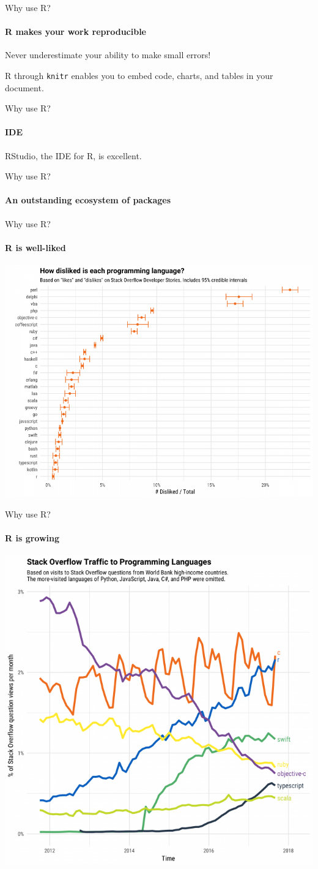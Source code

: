 \documentclass{grattan_pres}\usepackage[]{graphicx}\usepackage[]{color}
\begin{document}
\begin{frame}{Why use R?}
\framesubtitle{R makes your work reproducible}
Never underestimate your ability to make small errors!

R through \texttt{knitr} enables you to embed code, charts, and tables in your document.

\end{frame}

\begin{frame}{Why use R?}
\framesubtitle{IDE}

RStudio, the IDE for R, is excellent.
\end{frame}

\begin{frame}{Why use R?}
\framesubtitle{An outstanding ecosystem of packages}

\end{frame}

\begin{frame}{Why use R?}
\framesubtitle{R is well-liked}
\includegraphics[width=0.8\linewidth]{How-disliked-are-programming-languages-SO}
\end{frame}

\begin{frame}{Why use R?}
\framesubtitle{R is growing}
\includegraphics[width=0.8\linewidth]{Growth-of-R}
\end{frame}



\end{document}
